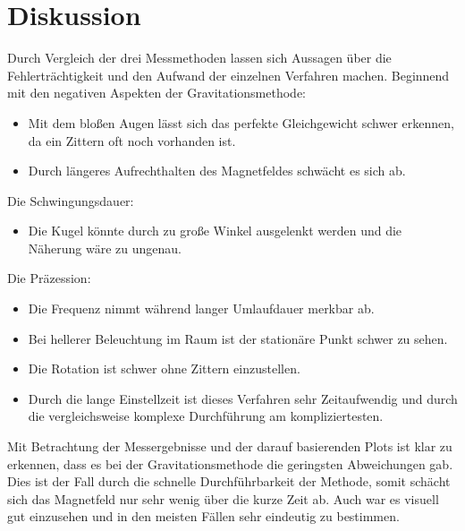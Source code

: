 \section{Diskussion}
\label{sec:Diskussion}
Durch Vergleich der drei Messmethoden lassen sich Aussagen über die Fehlerträchtigkeit und den Aufwand der einzelnen Verfahren machen.
Beginnend mit den negativen Aspekten der Gravitationsmethode:
\begin{itemize}
    \item Mit dem bloßen Augen lässt sich das perfekte Gleichgewicht schwer erkennen, da ein Zittern oft noch vorhanden ist.
    \item Durch längeres Aufrechthalten des Magnetfeldes schwächt es sich ab.
\end{itemize}
Die Schwingungsdauer:
\begin{itemize}
    \item Die Kugel könnte durch zu große Winkel ausgelenkt werden und die Näherung wäre zu ungenau. 
\end{itemize}
Die Präzession:
\begin{itemize}
    \item Die Frequenz nimmt während langer Umlaufdauer merkbar ab.
    \item Bei hellerer Beleuchtung im Raum ist der stationäre Punkt schwer zu sehen.
    \item Die Rotation ist schwer ohne Zittern einzustellen.
    \item Durch die lange Einstellzeit ist dieses Verfahren sehr Zeitaufwendig und durch die vergleichsweise komplexe Durchführung am kompliziertesten.
\end{itemize}

Mit Betrachtung der Messergebnisse und der darauf basierenden Plots ist klar zu erkennen, dass es bei der Gravitationsmethode die geringsten Abweichungen gab. 
Dies ist der Fall durch die schnelle Durchführbarkeit der Methode, somit schächt sich das Magnetfeld nur sehr wenig über die kurze Zeit ab.
Auch war es visuell gut einzusehen und in den meisten Fällen sehr eindeutig zu bestimmen. 